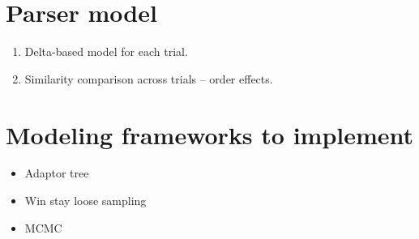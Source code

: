 \documentclass[11pt]{article}
\begin{document}
\section*{Parser model}

\begin{enumerate}
\item Delta-based model for each trial.
\item Similarity comparison across trials -- order effects.
\end{enumerate}

\section*{Modeling frameworks to implement}

\begin{itemize}
\item Adaptor tree
\item Win stay loose sampling
\item MCMC
\end{itemize}





















\end{document}
